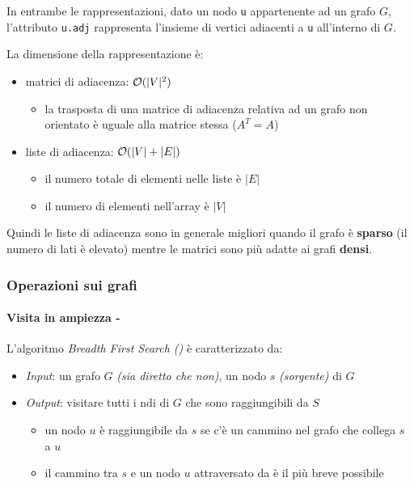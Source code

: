 \documentclass[italian, 10pt]{article}
\begin{document}
In entrambe le rappresentazioni, dato un nodo \texttt{u} appartenente ad un grafo \(G\), l'attributo \texttt{u.adj} rappresenta l'insieme di vertici adiacenti a \texttt{u} all'interno di \(G\).

\bigskip
La dimensione della rappresentazione è:

\begin{itemize}
  \item matrici di adiacenza: \(\mathcal{O}(|V|^2)\)
        \begin{itemize}
          \item la trasposta di una matrice di adiacenza relativa ad un grafo non orientato è uguale alla matrice stessa (\(A^T = A\))
        \end{itemize}
  \item liste di adiacenza: \(\mathcal{O}(|V|+|E|)\)
        \begin{itemize}
          \item il numero totale di elementi nelle liste è \(|E|\)
          \item il numero di elementi nell'array è \(|V|\)
        \end{itemize}
\end{itemize}

Quindi le liste di adiacenza sono in generale migliori quando il grafo è \textbf{sparso} (il numero di lati è elevato) mentre le matrici sono più adatte ai grafi \textbf{densi}.

\subsubsection{Operazioni sui grafi}

\paragraph{Visita in ampiezza - \BFS}
\label{par:grafi-bfs}

L'algoritmo \textit{Breadth First Search (\BFS)} è caratterizzato da:

\begin{itemize}
  \item \textit{Input}: un grafo \(G\) \textit{(sia diretto che non)}, un nodo \(s\) \textit{(sorgente)} di \(G\)
  \item \textit{Output}: visitare tutti i ndi di \(G\) che sono raggiungibili da \(S\)
        \begin{itemize}
          \item un nodo \(u\) è raggiungibile da \(s\) se c'è un cammino nel grafo che collega \(s\) a \(u\)
          \item il cammino tra \(s\) e un nodo \(u\) attraversato da \BFS è il più breve possibile
        \end{itemize}
\end{itemize}
\end{document}
